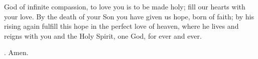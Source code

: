 \lettrine[lines=3]{G}{}od of infinite compassion,
to love you is to be made holy;
fill our hearts with your love.
By the death of your Son
you have given us hope, born of faith;
by his rising again
fulfill this hope
in the perfect love of heaven,
where he lives and reigns with you and the Holy Spirit,
one God, for ever and ever. \par \Rbar. Amen.
